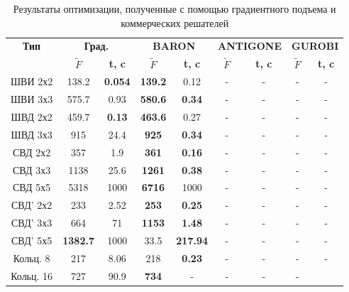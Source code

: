\begin{table}[!h]
\centering
\caption{ Результаты оптимизации, полученные с помощью градиентного подъема и коммерческих решателей}
\begin{tabular}{|c|c c|c c|c c|c c|}
    \hline
    \multirow{2}{*}{\textbf{Тип}} & \multicolumn{2}{c}{\textbf{Град.}} & \multicolumn{2}{|c|}{\textbf{BARON}} & \multicolumn{2}{|c|}{\textbf{ANTIGONE}} & \multicolumn{2}{|c|}{\textbf{GUROBI}}\\
    & \textbf{$\tilde{F}$} & \textbf{t, c} & \textbf{$\tilde{F}$} & \textbf{t, c} & \textbf{$\tilde{F}$} & \textbf{t, c} & \textbf{$\tilde{F}$} & \textbf{t, c} \\
    \hline
    ШВИ 2х2 & 138.2 & \textbf{0.054} & \textbf{139.2} & 0.12 & - & - & - & - \\
    ШВИ 3х3 & 575.7 & 0.93 & \textbf{580.6} & \textbf{0.34} & - & - & - & -\\
    ШВД 2х2 & 459.7 & \textbf{0.13} & \textbf{463.6} & 0.27 &  - & - & - & - \\
    ШВД 3х3 & 915 & 24.4 & \textbf{925} & \textbf{0.34}  &  - & - & - & - \\
    СВД 2х2 & 357 & 1.9 & \textbf{361} & \textbf{0.16} &  - & - & - & - \\
    СВД 3х3 & 1138 & 25.6 & \textbf{1261} & \textbf{0.38} &  - & - & - & - \\
    СВД 5х5 & 5318 & 1000 & \textbf{6716} & 1000 & - & - & - & - \\
    СВД' 2х2 & 233 & 2.52 & \textbf{253} & \textbf{0.25} & - & - & - & -\\
    СВД' 3х3 & 664 & 71 & \textbf{1153} & \textbf{1.48} & - & - & - & - \\
    СВД' 5х5 & \textbf{1382.7} & 1000 & 33.5 & \textbf{217.94}  &  - & - & - & - \\
    Кольц. 8 & 217 & 8.06 & 218 & \textbf{0.23} & - & - & - & - \\
    Кольц. 16 & 727 & 90.9 & \textbf{734} & - & - & - & -\\
    \hline
\end{tabular}
\label{tab:results}
\end{table}

